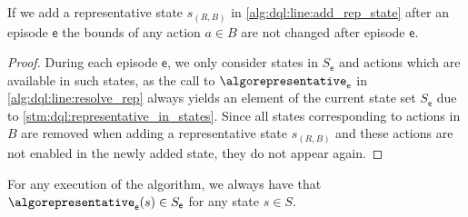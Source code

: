 \documentclass{article}
\newcommand{\States}{S}
\newcommand{\algoepisode}{\mathsf{e}}
\begin{document}
\begin{lemma} \label{stm:dql:collapsed_states_unchanged}
	If we add a representative state $s_{(R, B)}$ in \cref{alg:dql:line:add_rep_state} after an episode $\algoepisode$ the bounds of any action $a \in B$ are not changed after episode $\algoepisode$.
\end{lemma}

\begin{proof}
	During each episode $\algoepisode$, we only consider states in $\States_\algoepisode$ and actions which are available in such states, as the call to $\algorepresentative_\algoepisode$ in \cref{alg:dql:line:resolve_rep} always yields an element of the current state set $\States_\algoepisode$ due to \cref{stm:dql:representative_in_states}.
	Since all states corresponding to actions in $B$ are removed when adding a representative state $s_{(R, B)}$ and these actions are not enabled in the newly added state, they do not appear again. 
\end{proof}

\begin{lemma} \label{stm:dql:representative_in_states}
	For any execution of the algorithm, we always have that $\algorepresentative_\algoepisode(s) \in \States_\algoepisode$ for any state $s \in \States$.
\end{lemma}
\end{document}
